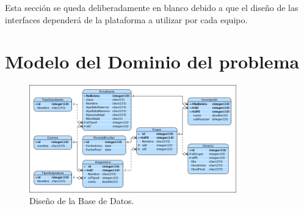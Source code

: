 \documentclass[oneside,10pt]{book}
\begin{document}
{\color{UCInterfaceColor} 
	Esta sección se queda deliberadamente en blanco debido a que el diseño de las interfaces dependerá de la plataforma a utilizar por cada equipo.\\	
}



\chapter{Modelo del Dominio del problema}

	\begin{figure}[htbp!]
		\centering
			\includegraphics[width=0.8\textwidth]{images/baseDeDatos}
		\caption{Diseño de la Base de Datos.}
	\end{figure}
	

\end{document}
